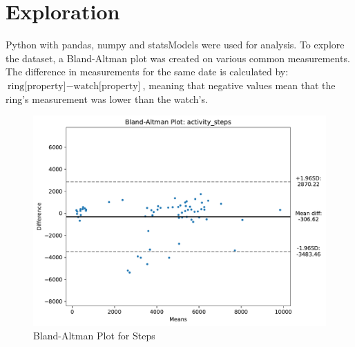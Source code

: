\section{Exploration}
Python with pandas, numpy and statsModels were used for analysis. To explore the dataset, a Bland-Altman plot was created on various common measurements. The difference in measurements for the same date is calculated by: $\text{ring[property]} - \text{watch[property]}$, meaning that negative values mean that the ring's measurement was lower than the watch's.
\begin{figure}
    
    \centering
    \includegraphics[width=\textwidth,keepaspectratio]{../images/bland_altman_steps.pdf}
    \caption{Bland-Altman Plot for Steps}
    \label{fig:blandAltmanSteps}
    
\end{figure}

